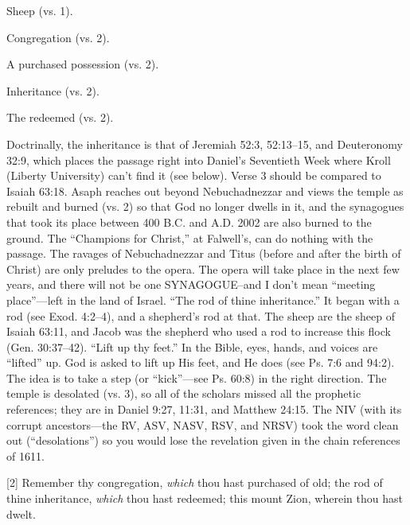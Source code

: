 {\begin{compactenum}
\item Sheep (vs. 1).
\item Congregation (vs. 2).
\item A purchased possession (vs. 2).
\item Inheritance (vs. 2).
\item The redeemed (vs. 2).
\end{compactenum}
Doctrinally, the inheritance is that of Jeremiah 52:3, 52:13--15, and Deuteronomy 32:9, which places the passage right into Daniel’s Seventieth Week where Kroll (Liberty University) can’t find it (see below). Verse 3 should be compared to Isaiah 63:18. Asaph reaches out beyond Nebuchadnezzar and views the temple as rebuilt and burned (vs. 2) so that God no longer dwells in it, and the synagogues that took its place between 400 B.C. and A.D. 2002 are also burned to the ground. The “Champions for Christ,” at Falwell’s, can do nothing with the passage. The ravages of Nebuchadnezzar and Titus (before and after the birth of Christ) are only preludes to the opera. The opera will take place in the next few years, and there will not be one SYNAGOGUE--and I don’t mean “meeting place”—left in the land of Israel. “The rod of thine inheritance.” It began with a rod (see Exod. 4:2–4), and a  shepherd’s rod at that. The sheep are the sheep of Isaiah 63:11, and Jacob was the shepherd who used a rod to increase this flock (Gen. 30:37–42). “Lift up thy feet.” In the Bible, eyes, hands, and voices are “lifted” up. God is asked to lift up His feet, and He does (see Ps. 7:6 and 94:2). The idea is to take a step (or “kick”—see Ps. 60:8) in the right direction. The temple is desolated (vs. 3), so all of the scholars missed all the prophetic references; they are in Daniel 9:27, 11:31, and Matthew 24:15. The NIV (with its corrupt ancestors—the RV, ASV, NASV, RSV, and NRSV) took the word clean out (“desolations”) so you would lose the revelation given in the chain references of 1611. \cite{Ruckman1992Psalms} }
[2] \textcolor[rgb]{0.00,0.00,1.00}{Remember thy congregation, \emph{which} thou hast purchased of old; the rod of thine inheritance, \emph{which} thou hast redeemed; this mount Zion, wherein thou hast dwelt.}
